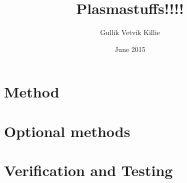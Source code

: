 \documentclass[x11names,twoside,english]{uiofysmaster}
\author{Gullik Vetvik Killie}
\title{Plasmastuffs!!!!}
\date{June 2015}
\begin{document}
% 


% 

\chapter{Method}



% 

% 

% 

\appendix
\chapter{Optional methods}

\chapter{Verification and Testing}




\printbibliography
\end{document}
